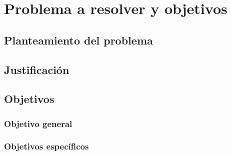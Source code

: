 \section{Problema a resolver y objetivos}

\subsection{Planteamiento del problema}

\subsection{Justificación}

\subsection{Objetivos}
    \subsubsection{Objetivo general}
    \subsubsection{Objetivos específicos}
